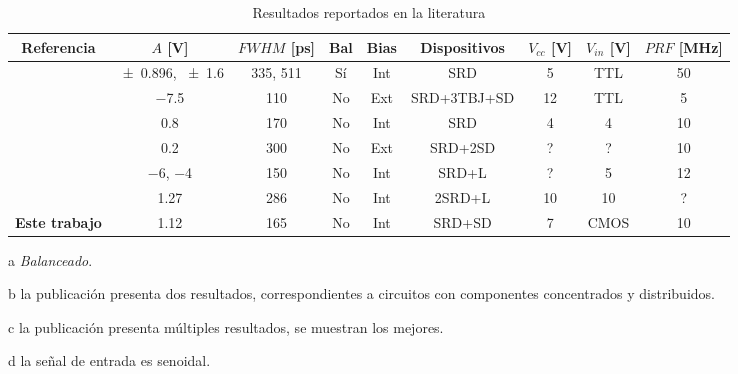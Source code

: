 \begin{table}
  \begin{threeparttable}[b]
    \caption{Resultados reportados en la literatura}
    \label{tab:resultados_literatura}
    {\footnotesize
    \begin{tabular}{ccccccccc}
        \hline
        Referencia & $A$ [\unit{\volt}] & $FWHM$ [\unit{\pico\second}] &
        Bal \tnote{a} & Bias & Dispositivos & $V_{cc}$ [\unit{\volt}] & $V_{in}$ [\unit{\volt}] & $PRF$ [\unit{\mega\hertz}] \\
        \hline
        \cite{rulikowski2004} & \num{\pm 0.896}, \num{\pm 1.6} \tnote{b} & 335, 511 & Sí & Int & SRD & 5 & TTL & 50 \\
        \cite{protiva2009} & \num{-7.5} & 110 & No & Ext & SRD+3TBJ+SD & 12 & TTL & 5 \\
        \cite{kamal2014} & \num{0.8} & 170 & No & Int & SRD & 4 & 4 & 10 \\
        \cite{han2002} & \num{0.2} & 300 & No & Ext & SRD+2SD & ? & ? & 10 \\
        \cite{han2005} & \num{-6}, \num{-4} & 150 & No & Int & SRD+L & ? & 5 & 12 \\
        \cite{oloumi2018} & \num{1.27} \tnote{c} & 286 & No & Int & 2SRD+L & 10 & 10 \tnote{d} & ? \\
        \textbf{Este trabajo} & \num{1.12} & 165 & No & Int & SRD+SD & 7 & CMOS  &
        \num{10} \\
    \end{tabular}
}
   \begin{tablenotes}
     \item [a] \textit{Balanceado}.
     \item [b] la publicación presenta dos resultados, correspondientes a
       circuitos con componentes concentrados y distribuidos.
     \item [c] la publicación presenta múltiples resultados, se muestran
       los mejores.
     \item [d] la señal de entrada es senoidal.
   \end{tablenotes}
  \end{threeparttable}
\end{table}

